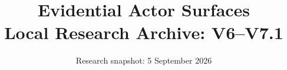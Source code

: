 \documentclass[10pt,twocolumn,letterpaper]{article}
\title{Evidential Actor Surfaces\\Local Research Archive: V6--V7.1}
\author{Research snapshot: 5 September 2026}
\begin{document}
\maketitle
\appendix
\renewcommand{\thefigure}{S\arabic{figure}}
\renewcommand{\thetable}{S\arabic{table}}
\renewcommand{\theequation}{S\arabic{equation}}










{\small


}
\end{document}
